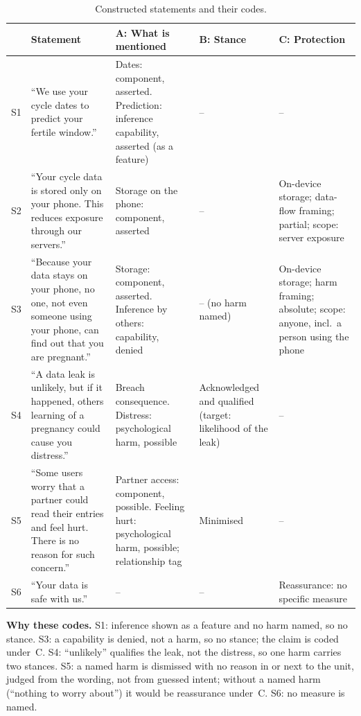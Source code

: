 \documentclass[sigconf,nonacm,natbib=false]{acmart}
\begin{document}
\begin{table}[h]
\caption{Constructed statements and their codes.}
\label{tab:worked}
\small
\begin{tabular}{@{}L{0.5cm}L{4.7cm}L{4.1cm}L{2.5cm}L{4.3cm}@{}}
\toprule
 & \textbf{Statement} & \textbf{A: What is mentioned} & \textbf{B: Stance}
 & \textbf{C: Protection} \\
\midrule
S1 & \enquote{We use your cycle dates to predict your fertile window.}
   & Dates: component, asserted. Prediction: inference capability, asserted
     (as a feature) & -- & -- \\
\addlinespace
S2 & \enquote{Your cycle data is stored only on your phone. This reduces
     exposure through our servers.}
   & Storage on the phone: component, asserted & --
   & On-device storage; data-flow framing; partial; scope: server exposure \\
\addlinespace
S3 & \enquote{Because your data stays on your phone, no one, not even someone
     using your phone, can find out that you are pregnant.}
   & Storage: component, asserted. Inference by others: capability, denied
   & -- (no harm named)
   & On-device storage; harm framing; absolute; scope: anyone, incl.\ a person
     using the phone \\
\addlinespace
S4 & \enquote{A data leak is unlikely, but if it happened, others learning of
     a pregnancy could cause you distress.}
   & Breach consequence. Distress: psychological harm, possible
   & Acknowledged and qualified (target: likelihood of the leak) & -- \\
\addlinespace
S5 & \enquote{Some users worry that a partner could read their entries and
     feel hurt. There is no reason for such concern.}
   & Partner access: component, possible. Feeling hurt: psychological harm,
     possible; relationship tag
   & Minimised & -- \\
\addlinespace
S6 & \enquote{Your data is safe with us.} & -- & --
   & Reassurance: no specific measure \\
\bottomrule
\end{tabular}
\end{table}

\noindent\textbf{Why these codes.} S1: inference shown as a feature and no
harm named, so no stance. S3: a capability is denied, not a harm, so no
stance; the claim is coded under~C. S4: \enquote{unlikely} qualifies the leak,
not the distress, so one harm carries two stances. S5: a named harm is
dismissed with no reason in or next to the unit, judged from the wording, not
from guessed intent; without a named harm (\enquote{nothing to worry about})
it would be reassurance under~C. S6: no measure is named.
\end{document}
